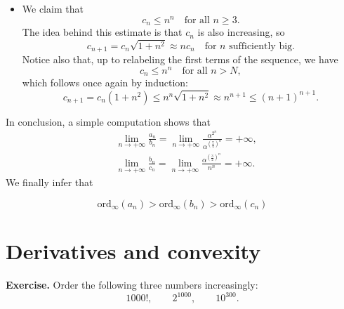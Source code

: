 \documentclass[a4paper,10 pt]{report}
\newcommand{\finalanswer}[1]{%
    \begin{finalAnswer}
    \[
        #1
    \]
    \end{finalAnswer}
}
\theoremstyle{definition}
\begin{document}
\begin{solutionBox}
\begin{itemize}
\item We claim that
\begin{equation*} c_n \leq n^n \quad \text{for all $n \geq 3$}.\end{equation*}
The idea behind this estimate is that $c_n$ is also increasing, so
\begin{equation*} c_{n + 1} = c_n \sqrt{1 + n^2} \approx n c_n \quad \text{for $n$ sufficiently big}. \end{equation*}
Notice also that, up to relabeling the first terms of the sequence, we have
\begin{equation*} c_n \leq n^n \quad \text{for all $n > N$}, \end{equation*}
which follows once again by induction:
\begin{equation*} c_{n + 1} = c_n \left( 1 + n^2 \right)  \leq n^n \sqrt{1 + n^2} \approx n^{n + 1} \leq (n + 1)^{n + 1}. \end{equation*}
\end{itemize}

In conclusion, a simple computation shows that
\begin{equation*} \begin{aligned}
& \lim_{n \to + \infty} \frac{a_n}{b_n} = \lim_{n \to + \infty} \frac{\alpha^{2^n}}{\alpha^{\left( \frac{7}{4} \right)^n}} = + \infty, 
\\ & \lim_{n \to + \infty} \frac{b_n}{c_n} = \lim_{n \to + \infty} \frac{\alpha^{\left( \frac{3}{2} \right)^n}}{n^n} = + \infty. 
\end{aligned}\end{equation*}
We finally infer that
\finalanswer{\mathrm{ord}_\infty(a_n) > \mathrm{ord}_\infty(b_n) > \mathrm{ord}_\infty(c_n)}
\end{solutionBox}


\chapter{Derivatives and convexity}

\begin{exerciseBox} \textbf{Exercise.} Order the following three numbers increasingly:
\begin{equation*}1000!, \qquad 2^{1000}, \qquad 10^{300}. \end{equation*}
\end{exerciseBox}
\end{document}
